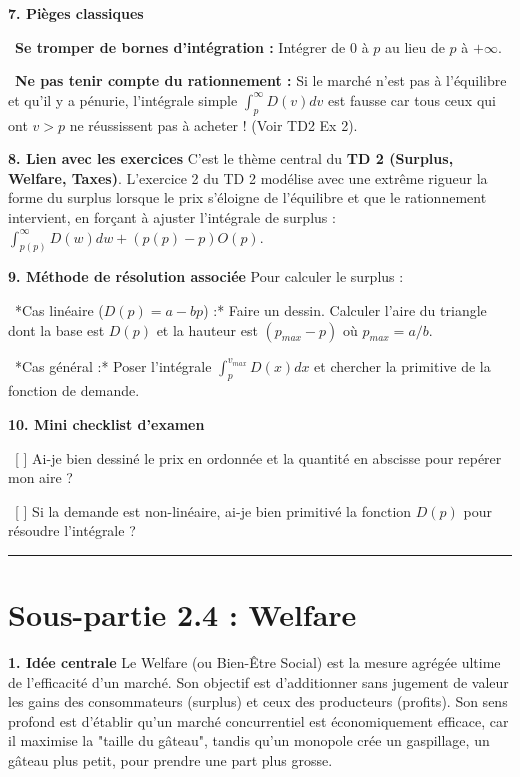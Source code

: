 \documentclass[11pt, a4paper]{report}
\begin{document}
\textbf{7. Pièges classiques}
\par \textbullet\ \textbf{Se tromper de bornes d'intégration :} Intégrer de $0$ à $p$ au lieu de $p$ à $+\infty$.
\par \textbullet\ \textbf{Ne pas tenir compte du rationnement :} Si le marché n'est pas à l'équilibre et qu'il y a pénurie, l'intégrale simple $\int_p^\infty D(v) dv$ est fausse car tous ceux qui ont $v>p$ ne réussissent pas à acheter ! (Voir TD2 Ex 2).

\textbf{8. Lien avec les exercices}
C'est le thème central du \textbf{TD 2 (Surplus, Welfare, Taxes)}. L'exercice 2 du TD 2 modélise avec une extrême rigueur la forme du surplus lorsque le prix s'éloigne de l'équilibre et que le rationnement intervient, en forçant à ajuster l'intégrale de surplus : $\int_{p(p)}^\infty D(w)dw + (p(p)-p)O(p)$.

\textbf{9. Méthode de résolution associée}
Pour calculer le surplus :
\par \textbullet\ *Cas linéaire ($D(p) = a - bp$) :* Faire un dessin. Calculer l'aire du triangle dont la base est $D(p)$ et la hauteur est $(p_{max} - p)$ où $p_{max} = a/b$.
\par \textbullet\ *Cas général :* Poser l'intégrale $\int_p^{v_{max}} D(x) dx$ et chercher la primitive de la fonction de demande.

\textbf{10. Mini checklist d'examen}
\par \textbullet\ [ ] Ai-je bien dessiné le prix en ordonnée et la quantité en abscisse pour repérer mon aire ?
\par \textbullet\ [ ] Si la demande est non-linéaire, ai-je bien primitivé la fonction $D(p)$ pour résoudre l'intégrale ?

\vspace{1cm}\hrule\vspace{1cm}

\section{Sous-partie 2.4 : Welfare}

\textbf{1. Idée centrale}
Le Welfare (ou Bien-Être Social) est la mesure agrégée ultime de l'efficacité d'un marché. Son objectif est d'additionner sans jugement de valeur les gains des consommateurs (surplus) et ceux des producteurs (profits). Son sens profond est d'établir qu'un marché concurrentiel est économiquement efficace, car il maximise la "taille du gâteau", tandis qu'un monopole crée un gaspillage, un gâteau plus petit, pour prendre une part plus grosse.
\end{document}
